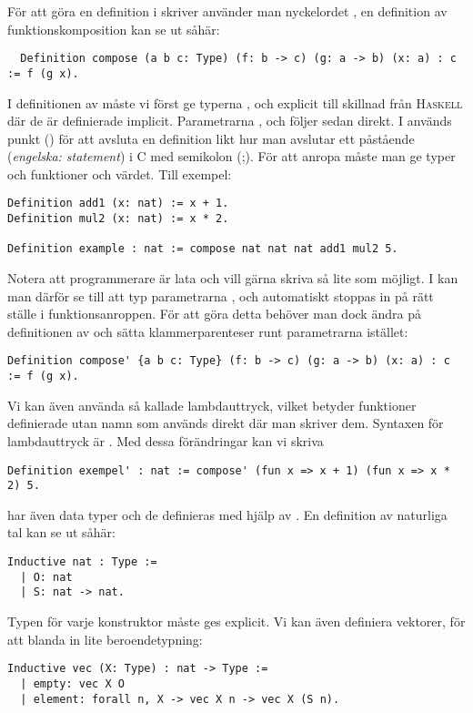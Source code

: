 För att göra en definition i \coq{} skriver använder man nyckelordet
, en definition av funktionskomposition kan se ut såhär:
\begin{lstlisting}
  Definition compose (a b c: Type) (f: b -> c) (g: a -> b) (x: a) : c := f (g x).
\end{lstlisting}
I definitionen av  måste vi först ge typerna ,  och 
explicit till skillnad från \textsc{Haskell} där de är definierade implicit.
Parametrarna ,  och  följer sedan direkt. I \coq{} används punkt
() för att avsluta en definition likt hur man avslutar ett påstående
(\emph{engelska: statement}) i C med semikolon (;). För att anropa 
måste man ge typer och funktioner och värdet. Till exempel:
\begin{lstlisting}
Definition add1 (x: nat) := x + 1.
Definition mul2 (x: nat) := x * 2.

Definition example : nat := compose nat nat nat add1 mul2 5.
\end{lstlisting}
Notera att programmerare är lata och vill gärna skriva så lite som möjligt. I
\coq{} kan man därför se till att typ parametrarna ,  och 
automatiskt stoppas in på rätt ställe i funktionsanroppen. För att göra detta
behöver man dock ändra på definitionen av  och sätta
klammerparenteser runt parametrarna istället:
\begin{lstlisting}
Definition compose' {a b c: Type} (f: b -> c) (g: a -> b) (x: a) : c := f (g x).
\end{lstlisting}
Vi kan även använda så kallade lambdauttryck, vilket betyder funktioner
definierade utan namn som används direkt där man skriver dem. Syntaxen för
lambdauttryck är . Med dessa förändringar kan
vi skriva
\begin{lstlisting}
Definition exempel' : nat := compose' (fun x => x + 1) (fun x => x * 2) 5.
\end{lstlisting}
\coq{} har även data typer och de definieras med hjälp av . En
definition av naturliga tal kan se ut såhär:
\begin{lstlisting}
Inductive nat : Type :=
  | O: nat
  | S: nat -> nat.
\end{lstlisting}
Typen för varje konstruktor måste ges explicit. Vi kan även definiera vektorer, för
att blanda in lite beroendetypning:
\begin{lstlisting}
Inductive vec (X: Type) : nat -> Type :=
  | empty: vec X O
  | element: forall n, X -> vec X n -> vec X (S n).
\end{lstlisting}

